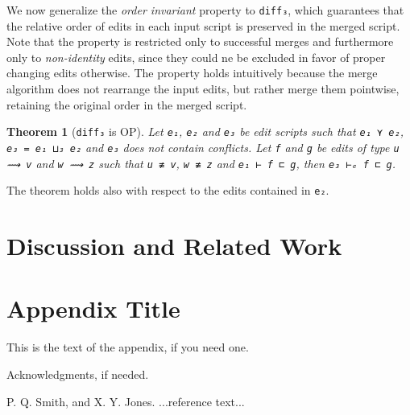 \documentclass[preprint]{sigplanconf}
\theoremstyle{plain}
\newtheorem{thm}{Theorem}
\begin{document}
We now generalize the \emph{order invariant} property to
\texttt{diff₃}, which guarantees that the relative order of edits in
each input script is preserved in the merged script.
%
Note that the property is restricted only to successful merges and
furthermore only to \emph{non-identity} edits, since they could 
ne be excluded in favor of proper changing edits otherwise.
%
The property holds intuitively because the merge algorithm does not
rearrange the input edits, but rather merge them pointwise, retaining
the original order in the merged script.
%
\begin{thm}[\texttt{diff₃} is OP]
  Let \texttt{e₁}, \texttt{e₂} and \texttt{e₃} be edit scripts such
  that \texttt{e₁ ⋎ e₂}, \texttt{e₃ = e₁ ⊔₃ e₂} and \texttt{e₃} does not
  contain conflicts.
%
  Let \texttt{f} and \texttt{g} be edits of type \texttt{u ⟿ v} and
  \texttt{w ⟿ z} such that \texttt{u ≢ v}, \texttt{w ≢ z} and
  \texttt{e₁ ⊢ f ⊏ g}, then \texttt{e₃ ⊢ₑ f ⊏ g}.
\end{thm}
  The theorem holds also with respect to the edits contained in \texttt{e₂}.

\section{Discussion and Related Work}
\label{sec:related-work}

\appendix
\section{Appendix Title}

This is the text of the appendix, if you need one.

\acks

Acknowledgments, if needed.





\begin{thebibliography}{}
\softraggedright

P. Q. Smith, and X. Y. Jones. ...reference text...

\end{thebibliography}

\listoftodos
\end{document}
